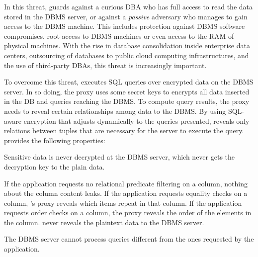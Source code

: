 In this threat, \name{} guards against a curious DBA who has full access to
read the data stored in the DBMS server, or against a {\em passive}
adversary who manages to gain access to the DBMS machine. This includes protection against DBMS software compromises, root access to DBMS machines or even access to the RAM of physical machines.
With the rise in database consolidation inside enterprise data
centers, outsourcing of databases to public cloud computing
infrastructures, and the use of third-party DBAs, this threat is
increasingly important. %
 

To overcome this threat, \name{} executes SQL queries over encrypted
data on the DBMS server.  In so doing, the proxy uses some secret keys to encrypts all data inserted in the DB and queries reaching the DBMS\@.
 To compute query results, the proxy needs to reveal
certain relationships among data to the DBMS\@.
By using SQL-aware encryption that adjusts dynamically to the queries
presented, \name{} reveals only relations between tuples that are
necessary for the server to execute the query. \name{} provides the following properties:




\begin{CompactItemize}

\item Sensitive data is never decrypted at the DBMS server,
    which never gets the decryption key to the plain data.

  \item If the application requests no relational predicate filtering
    on a column, nothing about the column content leaks.  If the
    application requests equality checks on a column, \name{}'s proxy
    reveals which items repeat in that column.  If the application
    requests order checks on a column, the proxy reveals the order of
    the elements in the column.  \name{} never reveals the plaintext
    data to the DBMS server.

\item The DBMS server cannot process queries 
  different from the ones requested by the application.
  


\end{CompactItemize}

